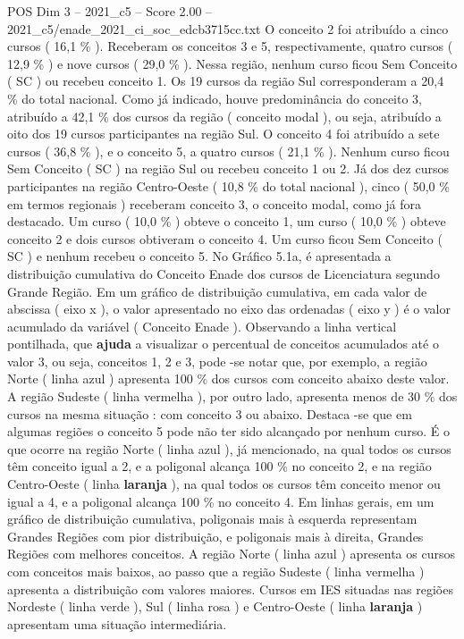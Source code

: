 \begin{textsample}{POS Dim 3 – 2021\_c5 – Score 2.00 – 2021\_c5/enade\_2021\_ci\_soc\_edcb3715cc.txt}
O conceito 2 foi atribuído a cinco cursos ( 16,1 \% ).
Receberam os conceitos 3 e 5, respectivamente, quatro cursos ( 12,9 \% ) e nove cursos ( 29,0 \% ).
Nessa região, nenhum curso ficou Sem Conceito ( SC ) ou recebeu conceito 1.
Os 19 cursos da região Sul corresponderam a 20,4 \% do total nacional.
Como já indicado, houve predominância do conceito 3, atribuído a 42,1 \% dos cursos da região ( conceito modal ), ou seja, atribuído a oito dos 19 cursos participantes na região Sul.
O conceito 4 foi atribuído a sete cursos ( 36,8 \% ), e o conceito 5, a quatro cursos ( 21,1 \% ).
Nenhum curso ficou Sem Conceito ( SC ) na região Sul ou recebeu conceito 1 ou 2.
Já dos dez cursos participantes na região Centro-Oeste ( 10,8 \% do total nacional ), cinco ( 50,0 \% em termos regionais ) receberam conceito 3, o conceito modal, como já fora destacado.
Um curso ( 10,0 \% ) obteve o conceito 1, um curso ( 10,0 \% ) obteve conceito 2 e dois cursos obtiveram o conceito 4.
Um curso ficou Sem Conceito ( SC ) e nenhum recebeu o conceito 5.
No Gráfico 5.1a, é apresentada a distribuição cumulativa do Conceito Enade dos cursos de Licenciatura segundo Grande Região.
Em um gráfico de distribuição cumulativa, em cada valor de abscissa ( eixo x ), o valor apresentado no eixo das ordenadas ( eixo y ) é o valor acumulado da variável ( Conceito Enade ).
Observando a linha vertical pontilhada, que \textbf{ajuda} a visualizar o percentual de conceitos acumulados até o valor 3, ou seja, conceitos 1, 2 e 3, pode -se notar que, por exemplo, a região Norte ( linha azul ) apresenta 100 \% dos cursos com conceito abaixo deste valor.
A região Sudeste ( linha vermelha ), por outro lado, apresenta menos de 30 \% dos cursos na mesma situação : com conceito 3 ou abaixo.
Destaca -se que em algumas regiões o conceito 5 pode não ter sido alcançado por nenhum curso.
É o que ocorre na região Norte ( linha azul ), já mencionado, na qual todos os cursos têm conceito igual a 2, e a poligonal alcança 100 \% no conceito 2, e na região Centro-Oeste ( linha \textbf{laranja} ), na qual todos os cursos têm conceito menor ou igual a 4, e a poligonal alcança 100 \% no conceito 4.
Em linhas gerais, em um gráfico de distribuição cumulativa, poligonais mais à esquerda representam Grandes Regiões com pior distribuição, e poligonais mais à direita, Grandes Regiões com melhores conceitos.
A região Norte ( linha azul ) apresenta os cursos com conceitos mais baixos, ao passo que a região Sudeste ( linha vermelha ) apresenta a distribuição com valores maiores.
Cursos em IES situadas nas regiões Nordeste ( linha verde ), Sul ( linha rosa ) e Centro-Oeste ( linha \textbf{laranja} ) apresentam uma situação intermediária.

\end{textsample}
